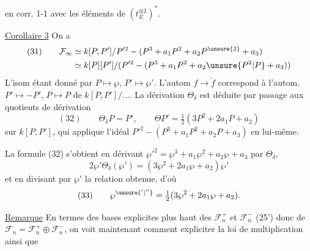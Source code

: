 
en corr. 1-1 avec les éléments de $(t_E^{\otimes2})^*$.

\uline{Corollaire 3} On a
\[
\begin{aligned}
(31)\qquad \mathcal F_\infty&\simeq k[P,P']/P'^2-(P^3+a_1P^2+a_2P^{\unsure{2}}+a_3)\\
&\simeq k[P][P']/(P'^2-(P^3+a_1P^2+a_2\unsure{P^2|P}+a_3))
\end{aligned}
\]
L'isom étant donné par $P\longmapsto\wp$, $P'\longmapsto\wp'$.
L'autom $f\longrightarrow\check f$ correspond à l'autom.
$P'\longmapsto-P'$, $P\longmapsto P$ de $k[P,P']/\ldots$.
La dérivation $\Theta_\delta$ est déduite par passage aux quotients de
 dérivation
\[
(32)\qquad \Theta_\delta P=P',\qquad \Theta P'=\tfrac12(3P^2+2a_1P+a_2)
\]
sur $k[P,P']$, qui applique l'idéal $P'^2-(P^3+a_1P^2+a_2P+a_3)$ en lui-même.

La formule (32) s'obtient en dérivant
$\wp'^2=\wp^3+a_1\wp^2+a_2\wp+a_3$ par $\Theta_\delta$,
 
\[
2\wp'\Theta_\delta(\wp')=(3\wp^2+2a_1\wp+a_2)\wp'
\]
et en divisant par $\wp'$ la relation obtenue, d'où
\[
(33)\qquad \wp^{\unsure{'|''}}=\tfrac12(3\wp^2+2a_1\wp+a_2).
\]

 \uline{Remarque} En termes des bases explicites plus haut des
$\mathcal F_n^+$ et $\mathcal F_n^-$ (25') donc de
$\mathcal F_n=\mathcal F_n^+\oplus\mathcal F_n^-$, on voit maintenant comment
expliciter la loi de multiplication 
ainsi que
